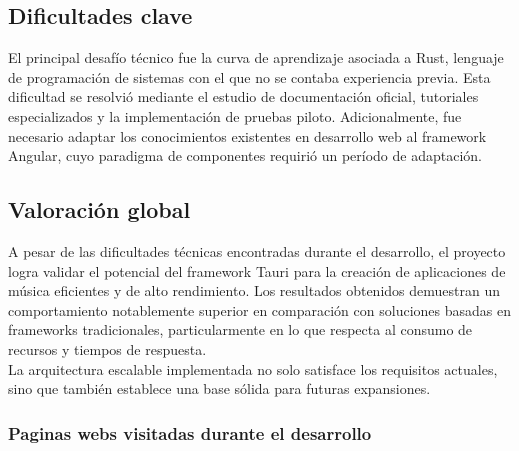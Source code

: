\documentclass[11pt, a4paper]{article}
\begin{document}
        \subsection{Dificultades clave}

        El principal desafío técnico fue la curva de aprendizaje asociada a Rust, lenguaje de programación de sistemas con el que no se contaba experiencia previa. Esta dificultad se resolvió mediante el estudio de documentación oficial, tutoriales especializados y la implementación de pruebas piloto. Adicionalmente, fue necesario adaptar los conocimientos existentes en desarrollo web al framework Angular, cuyo paradigma de componentes requirió un período de adaptación.

        \subsection{Valoración global}

        A pesar de las dificultades técnicas encontradas durante el desarrollo, el proyecto logra validar el potencial del framework Tauri para la creación de aplicaciones de música eficientes y de alto rendimiento. Los resultados obtenidos demuestran un comportamiento notablemente superior en comparación con soluciones basadas en frameworks tradicionales, particularmente en lo que respecta al consumo de recursos y tiempos de respuesta. \\

        La arquitectura escalable implementada no solo satisface los requisitos actuales, sino que también establece una base sólida para futuras expansiones.

          \subsubsection{Paginas webs visitadas durante el desarrollo}
\end{document}
